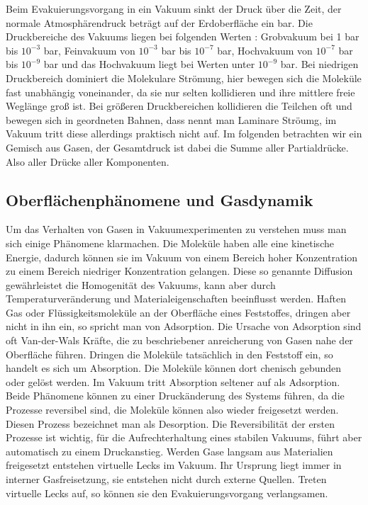 Beim Evakuierungsvorgang in ein Vakuum sinkt der Druck über die Zeit, der normale Atmosphärendruck beträgt auf der Erdoberfläche
ein bar. Die Druckbereiche des Vakuums liegen bei folgenden Werten :
Grobvakuum bei 1 bar bis $10^{-3}$ bar, Feinvakuum von $10^{-3}$ bar bis $10^{-7}$ bar, Hochvakuum von $10^{-7}$ bar bis $10^{-9}$ bar und
das Hochvakuum liegt bei Werten unter $10^{-9}$ bar.
Bei niedrigen Druckbereich dominiert die Molekulare Strömung, hier bewegen sich die Moleküle fast unabhängig voneinander,
da sie nur selten kollidieren und ihre mittlere freie Weglänge groß ist. Bei größeren Druckbereichen kollidieren die Teilchen oft 
und bewegen sich in geordneten Bahnen, dass nennt man Laminare Ströumg, im Vakuum tritt diese allerdings praktisch nicht auf.
Im folgenden betrachten wir ein Gemisch aus Gasen, der Gesamtdruck ist dabei die Summe aller Partialdrücke. Also aller
Drücke aller Komponenten.



\subsection{Oberflächenphänomene und Gasdynamik}


Um das Verhalten von Gasen in Vakuumexperimenten zu verstehen muss man sich einige Phänomene klarmachen.
Die Moleküle haben alle
eine kinetische Energie, dadurch können sie im Vakuum von einem Bereich hoher Konzentration zu einem Bereich niedriger Konzentration 
gelangen. Diese so genannte Diffusion gewährleistet die Homogenität des Vakuums, kann aber durch Temperaturveränderung und Materialeigenschaften
beeinflusst werden. Haften Gas oder Flüssigkeitsmoleküle an der Oberfläche eines Feststoffes, dringen aber nicht in ihn ein, so spricht man 
von Adsorption. Die Ursache von Adsorption sind oft Van-der-Wals Kräfte, die zu beschriebener anreicherung von Gasen nahe der Oberfläche führen.
Dringen die Moleküle tatsächlich in den Feststoff ein, so handelt es sich um Absorption. Die Moleküle können dort chenisch gebunden oder 
gelöst werden. Im Vakuum tritt Absorption seltener auf als Adsorption. Beide Phänomene können zu einer Druckänderung des Systems führen,
da die Prozesse reversibel sind, die Moleküle können also wieder freigesetzt werden. Diesen Prozess bezeichnet man als Desorption. Die
Reversibilität der ersten Prozesse ist wichtig, für die Aufrechterhaltung eines stabilen Vakuums, führt aber automatisch zu einem Druckanstieg. 
Werden Gase langsam aus Materialien freigesetzt entstehen virtuelle Lecks im Vakuum. Ihr Ursprung liegt immer in interner Gasfreisetzung, 
sie entstehen nicht durch externe Quellen. Treten virtuelle Lecks auf, so können sie den Evakuierungsvorgang verlangsamen.


